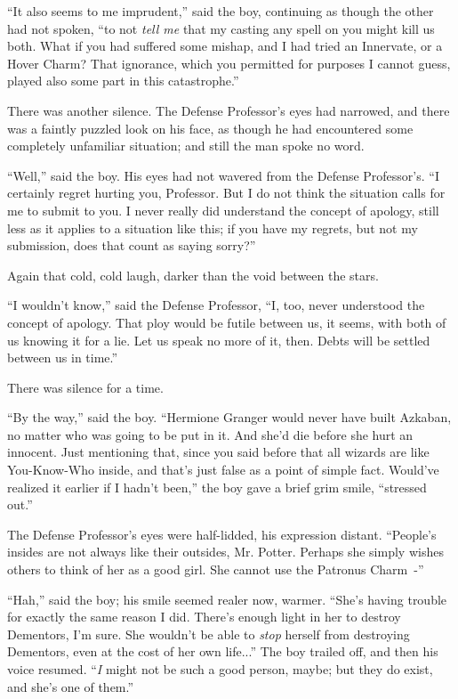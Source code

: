 ``It also seems to me imprudent,'' said the boy, continuing as though the other had not spoken, ``to not \emph{tell me} that my casting any spell on you might kill us both. What if you had suffered some mishap, and I had tried an Innervate, or a Hover Charm? That ignorance, which you permitted for purposes I cannot guess, played also some part in this catastrophe.''

There was another silence. The Defense Professor's eyes had narrowed, and there was a faintly puzzled look on his face, as though he had encountered some completely unfamiliar situation; and still the man spoke no word.

``Well,'' said the boy. His eyes had not wavered from the Defense Professor's. ``I certainly regret hurting you, Professor. But I do not think the situation calls for me to submit to you. I never really did understand the concept of apology, still less as it applies to a situation like this; if you have my regrets, but not my submission, does that count as saying sorry?''

Again that cold, cold laugh, darker than the void between the stars.

``I wouldn't know,'' said the Defense Professor, ``I, too, never understood the concept of apology. That ploy would be futile between us, it seems, with both of us knowing it for a lie. Let us speak no more of it, then. Debts will be settled between us in time.''

There was silence for a time.

``By the way,'' said the boy. ``Hermione Granger would never have built Azkaban, no matter who was going to be put in it. And she'd die before she hurt an innocent. Just mentioning that, since you said before that all wizards are like You-Know-Who inside, and that's just false as a point of simple fact. Would've realized it earlier if I hadn't been,'' the boy gave a brief grim smile, ``stressed out.''

The Defense Professor's eyes were half-lidded, his expression distant. ``People's insides are not always like their outsides, Mr. Potter. Perhaps she simply wishes others to think of her as a good girl. She cannot use the Patronus Charm~-''

``Hah,'' said the boy; his smile seemed realer now, warmer. ``She's having trouble for exactly the same reason I did. There's enough light in her to destroy Dementors, I'm sure. She wouldn't be able to \emph{stop} herself from destroying Dementors, even at the cost of her own life...'' The boy trailed off, and then his voice resumed. ``\emph{I} might not be such a good person, maybe; but they do exist, and she's one of them.''

